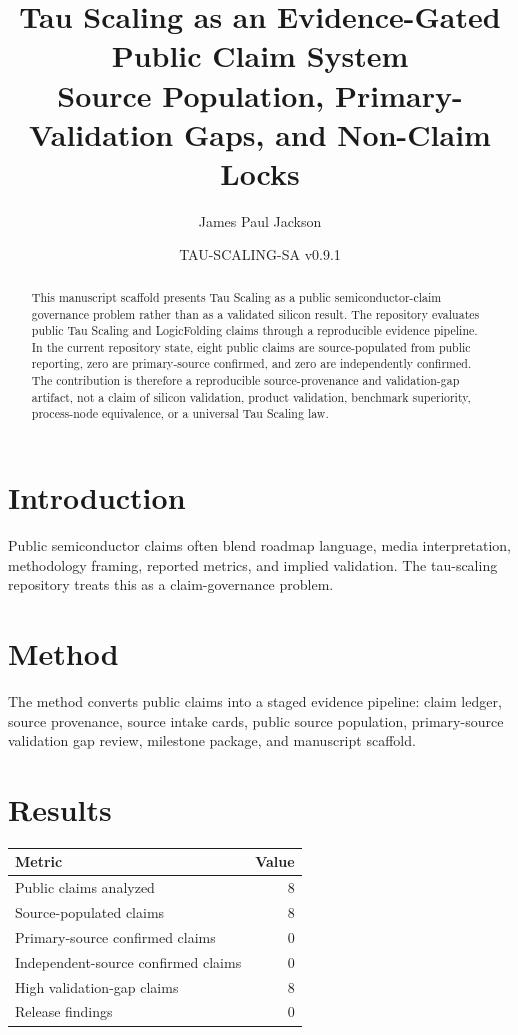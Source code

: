 \documentclass[11pt]{article}
\title{Tau Scaling as an Evidence-Gated Public Claim System\\
\large Source Population, Primary-Validation Gaps, and Non-Claim Locks}
\author{James Paul Jackson}
\date{TAU-SCALING-SA v0.9.1}
\begin{document}
\maketitle

\begin{abstract}
This manuscript scaffold presents Tau Scaling as a public semiconductor-claim governance problem rather than as a validated silicon result. The repository evaluates public Tau Scaling and LogicFolding claims through a reproducible evidence pipeline. In the current repository state, eight public claims are source-populated from public reporting, zero are primary-source confirmed, and zero are independently confirmed. The contribution is therefore a reproducible source-provenance and validation-gap artifact, not a claim of silicon validation, product validation, benchmark superiority, process-node equivalence, or a universal Tau Scaling law.
\end{abstract}

\section{Introduction}
Public semiconductor claims often blend roadmap language, media interpretation, methodology framing, reported metrics, and implied validation. The tau-scaling repository treats this as a claim-governance problem.

\section{Method}
The method converts public claims into a staged evidence pipeline:
claim ledger, source provenance, source intake cards, public source population, primary-source validation gap review, milestone package, and manuscript scaffold.

\section{Results}
\begin{center}
\begin{tabular}{lr}
\toprule
Metric & Value\\
\midrule
Public claims analyzed & 8\\
Source-populated claims & 8\\
Primary-source confirmed claims & 0\\
Independent-source confirmed claims & 0\\
High validation-gap claims & 8\\
Release findings & 0\\
\bottomrule
\end{tabular}
\end{center}
\end{document}
